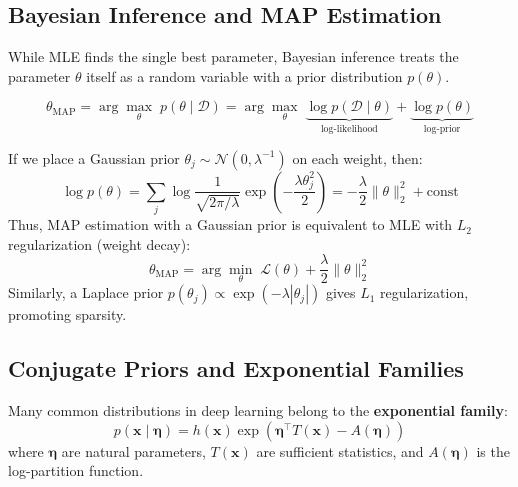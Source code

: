 \subsection{Bayesian Inference and MAP Estimation}

While MLE finds the single best parameter, Bayesian inference treats the parameter $\theta$ itself as a random variable with a prior distribution $p(\theta)$.

\begin{definition}
\begin{equation}
\theta_{\text{MAP}} = \arg\max_{\theta} \; p(\theta \mid \mathcal{D}) = \arg\max_{\theta} \; \underbrace{\log p(\mathcal{D} \mid \theta)}_{\text{log-likelihood}} + \underbrace{\log p(\theta)}_{\text{log-prior}}
\end{equation}
\end{definition}

\begin{example}
If we place a Gaussian prior $\theta_j \sim \mathcal{N}(0, \lambda^{-1})$ on each weight, then:
\begin{equation}
\log p(\theta) = \sum_j \log \frac{1}{\sqrt{2\pi/\lambda}} \exp\left(-\frac{\lambda \theta_j^2}{2}\right) = -\frac{\lambda}{2}\|\theta\|_2^2 + \text{const}
\end{equation}
Thus, MAP estimation with a Gaussian prior is equivalent to MLE with $L_2$ regularization (weight decay):
\begin{equation}
\theta_{\text{MAP}} = \arg\min_{\theta} \; \mathcal{L}(\theta) + \frac{\lambda}{2}\|\theta\|_2^2
\end{equation}
Similarly, a Laplace prior $p(\theta_j) \propto \exp(-\lambda|\theta_j|)$ gives $L_1$ regularization, promoting sparsity.
\end{example}

\subsection{Conjugate Priors and Exponential Families}

Many common distributions in deep learning belong to the \textbf{exponential family}:
\begin{equation}
p(\mathbf{x} \mid \boldsymbol{\eta}) = h(\mathbf{x}) \exp\left(\boldsymbol{\eta}^\top T(\mathbf{x}) - A(\boldsymbol{\eta})\right)
\end{equation}
where $\boldsymbol{\eta}$ are natural parameters, $T(\mathbf{x})$ are sufficient statistics, and $A(\boldsymbol{\eta})$ is the log-partition function.

